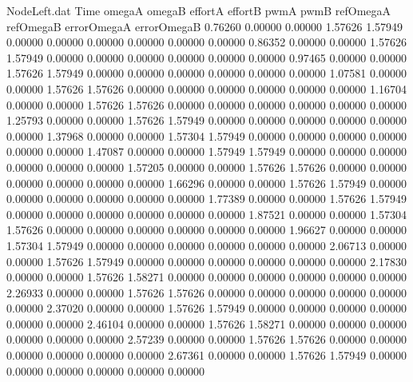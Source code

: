 \begin{filecontents}{NodeLeft.dat}
Time omegaA omegaB effortA effortB pwmA pwmB refOmegaA refOmegaB errorOmegaA errorOmegaB
   0.76260    0.00000    0.00000     1.57626    1.57949    0.00000    0.00000    0.00000    0.00000    0.00000    0.00000
   0.86352    0.00000    0.00000     1.57626    1.57949    0.00000    0.00000    0.00000    0.00000    0.00000    0.00000
   0.97465    0.00000    0.00000     1.57626    1.57949    0.00000    0.00000    0.00000    0.00000    0.00000    0.00000
   1.07581    0.00000    0.00000     1.57626    1.57626    0.00000    0.00000    0.00000    0.00000    0.00000    0.00000
   1.16704    0.00000    0.00000     1.57626    1.57626    0.00000    0.00000    0.00000    0.00000    0.00000    0.00000
   1.25793    0.00000    0.00000     1.57626    1.57949    0.00000    0.00000    0.00000    0.00000    0.00000    0.00000
   1.37968    0.00000    0.00000     1.57304    1.57949    0.00000    0.00000    0.00000    0.00000    0.00000    0.00000
   1.47087    0.00000    0.00000     1.57949    1.57949    0.00000    0.00000    0.00000    0.00000    0.00000    0.00000
   1.57205    0.00000    0.00000     1.57626    1.57626    0.00000    0.00000    0.00000    0.00000    0.00000    0.00000
   1.66296    0.00000    0.00000     1.57626    1.57949    0.00000    0.00000    0.00000    0.00000    0.00000    0.00000
   1.77389    0.00000    0.00000     1.57626    1.57949    0.00000    0.00000    0.00000    0.00000    0.00000    0.00000
   1.87521    0.00000    0.00000     1.57304    1.57626    0.00000    0.00000    0.00000    0.00000    0.00000    0.00000
   1.96627    0.00000    0.00000     1.57304    1.57949    0.00000    0.00000    0.00000    0.00000    0.00000    0.00000
   2.06713    0.00000    0.00000     1.57626    1.57949    0.00000    0.00000    0.00000    0.00000    0.00000    0.00000
   2.17830    0.00000    0.00000     1.57626    1.58271    0.00000    0.00000    0.00000    0.00000    0.00000    0.00000
   2.26933    0.00000    0.00000     1.57626    1.57626    0.00000    0.00000    0.00000    0.00000    0.00000    0.00000
   2.37020    0.00000    0.00000     1.57626    1.57949    0.00000    0.00000    0.00000    0.00000    0.00000    0.00000
   2.46104    0.00000    0.00000     1.57626    1.58271    0.00000    0.00000    0.00000    0.00000    0.00000    0.00000
   2.57239    0.00000    0.00000     1.57626    1.57626    0.00000    0.00000    0.00000    0.00000    0.00000    0.00000
   2.67361    0.00000    0.00000     1.57626    1.57949    0.00000    0.00000    0.00000    0.00000    0.00000    0.00000

\end{filecontents}
